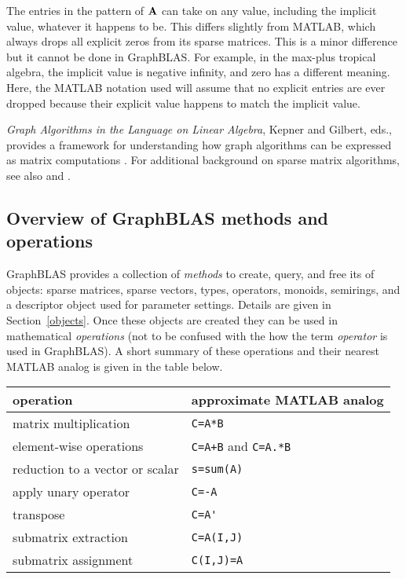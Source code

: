 \documentclass[12pt]{article}
\begin{document}
The entries in the pattern of ${\bf A}$ can take on any value, including the
implicit value, whatever it happens to be.  This differs slightly from MATLAB,
which always drops all explicit zeros from its sparse matrices.  This is a
minor difference but it cannot be done in GraphBLAS.  For example, in the
max-plus tropical algebra, the implicit value is negative infinity, and zero
has a different meaning.  Here, the MATLAB notation used will assume that no
explicit entries are ever dropped because their explicit value happens to match
the implicit value.

{\em Graph Algorithms in the Language on Linear Algebra}, Kepner and Gilbert,
eds., provides a framework for understanding how graph algorithms can be
expressed as matrix computations \cite{KepnerGilbert2011}.  For additional
background on sparse matrix algorithms, see also \cite{Davis06book} and
\cite{DavisRajamanickamSidLakhdar16}.

\subsection{Overview of GraphBLAS methods and operations} %
\label{overview}

GraphBLAS provides a collection of {\em methods} to create, query, and free its
of objects: sparse matrices, sparse vectors, types, operators, monoids,
semirings, and a descriptor object used for parameter settings.  Details are
given in Section~\ref{objects}.  Once these objects are created they can be
used in mathematical {\em operations} (not to be confused with the how the term
{\em operator} is used in GraphBLAS).  A short summary of these operations and
their nearest MATLAB analog is given in the table below.

\begin{tabular}{ll}
operation                           & approximate MATLAB analog \\
\hline
matrix multiplication               & \verb'C=A*B' \\
element-wise operations             & \verb'C=A+B' and \verb'C=A.*B' \\
reduction to a vector or scalar     & \verb's=sum(A)' \\
apply unary operator                & \verb'C=-A' \\
transpose                           & \verb"C=A'" \\
submatrix extraction                & \verb'C=A(I,J)' \\
submatrix assignment                & \verb'C(I,J)=A' \\
\hline
\end{tabular}
\vspace{0.1in}
\end{document}
